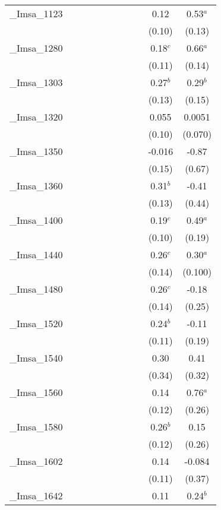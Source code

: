 \documentclass[]{article}
\begin{document}
\begin{tabular}{lcccccccccc}
\_Imsa\_1123 &  &  &  &  &  &  &  &  & 0.12 & 0.53$^a$ \\
 &  &  &  &  &  &  &  &  & (0.10) & (0.13) \\
\_Imsa\_1280 &  &  &  &  &  &  &  &  & 0.18$^c$ & 0.66$^a$ \\
 &  &  &  &  &  &  &  &  & (0.11) & (0.14) \\
\_Imsa\_1303 &  &  &  &  &  &  &  &  & 0.27$^b$ & 0.29$^b$ \\
 &  &  &  &  &  &  &  &  & (0.13) & (0.15) \\
\_Imsa\_1320 &  &  &  &  &  &  &  &  & 0.055 & 0.0051 \\
 &  &  &  &  &  &  &  &  & (0.10) & (0.070) \\
\_Imsa\_1350 &  &  &  &  &  &  &  &  & -0.016 & -0.87 \\
 &  &  &  &  &  &  &  &  & (0.15) & (0.67) \\
\_Imsa\_1360 &  &  &  &  &  &  &  &  & 0.31$^b$ & -0.41 \\
 &  &  &  &  &  &  &  &  & (0.13) & (0.44) \\
\_Imsa\_1400 &  &  &  &  &  &  &  &  & 0.19$^c$ & 0.49$^a$ \\
 &  &  &  &  &  &  &  &  & (0.10) & (0.19) \\
\_Imsa\_1440 &  &  &  &  &  &  &  &  & 0.26$^c$ & 0.30$^a$ \\
 &  &  &  &  &  &  &  &  & (0.14) & (0.100) \\
\_Imsa\_1480 &  &  &  &  &  &  &  &  & 0.26$^c$ & -0.18 \\
 &  &  &  &  &  &  &  &  & (0.14) & (0.25) \\
\_Imsa\_1520 &  &  &  &  &  &  &  &  & 0.24$^b$ & -0.11 \\
 &  &  &  &  &  &  &  &  & (0.11) & (0.19) \\
\_Imsa\_1540 &  &  &  &  &  &  &  &  & 0.30 & 0.41 \\
 &  &  &  &  &  &  &  &  & (0.34) & (0.32) \\
\_Imsa\_1560 &  &  &  &  &  &  &  &  & 0.14 & 0.76$^a$ \\
 &  &  &  &  &  &  &  &  & (0.12) & (0.26) \\
\_Imsa\_1580 &  &  &  &  &  &  &  &  & 0.26$^b$ & 0.15 \\
 &  &  &  &  &  &  &  &  & (0.12) & (0.26) \\
\_Imsa\_1602 &  &  &  &  &  &  &  &  & 0.14 & -0.084 \\
 &  &  &  &  &  &  &  &  & (0.11) & (0.37) \\
\_Imsa\_1642 &  &  &  &  &  &  &  &  & 0.11 & 0.24$^b$ \\

\end{tabular}
\end{document}
